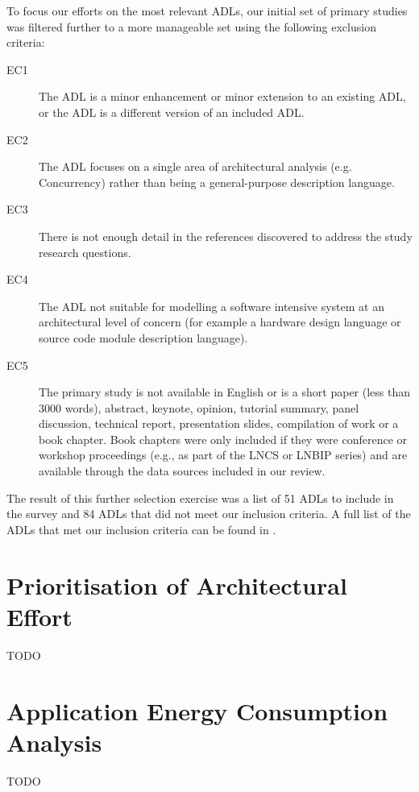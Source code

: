 To focus our efforts on the most relevant ADLs, our initial set of primary studies was filtered further to a more manageable set using the following exclusion criteria:

\begin{description}
\item[EC1] The ADL is a minor enhancement or minor extension to an existing ADL, or the ADL is a different version of an included ADL.
\item[EC2] The ADL focuses on a single area of architectural analysis (e.g. Concurrency) rather than being a general-purpose description language.
\item[EC3] There is not enough detail in the references discovered to address the study research questions.
\item[EC4] The ADL not suitable for modelling a software intensive system at an architectural level of concern (for example a hardware design language or source code module description language).
\item[EC5] The primary study is not available in English or is a short paper (less than 3000 words), abstract, keynote, opinion, tutorial summary, panel discussion, technical report, presentation slides, compilation of work or a book chapter. Book chapters were only included if they were conference or workshop proceedings (e.g., as part of the LNCS or LNBIP series) and are available through the data sources included in our review. 
\end{description}

The result of this further selection exercise was a list of 51 ADLs to include in the survey and 84 ADLs that did not meet our inclusion criteria.  A full list of the ADLs that met our inclusion criteria can be found in .


\section{Prioritisation of Architectural Effort}

TODO

\section{Application Energy Consumption Analysis} \label{sec:litreviewenergy}

TODO
